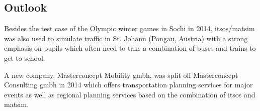 \subsection{Outlook}
Besides the test case of the Olympic winter games in Sochi in 2014, \gls{itsos}/\gls{matsim}
was also used to simulate traffic in St. Johann (Pongau, Austria) with a strong
emphasis on pupils which often need to take a combination of buses and trains to
get to school.

A new company, Masterconcept Mobility \gls{gmbh}, was split off Masterconcept Consulting \gls{gmbh} in 2014 
which offers transportation planning services for major events as well as regional planning services 
based on the combination of \gls{itsos} and \gls{matsim}.

